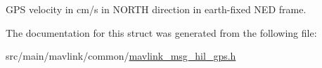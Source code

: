 G\+P\+S velocity in cm/s in N\+O\+R\+T\+H direction in earth-\/fixed N\+E\+D frame. 



The documentation for this struct was generated from the following file\+:\begin{DoxyCompactItemize}
\item 
src/main/mavlink/common/\hyperlink{mavlink__msg__hil__gps_8h}{mavlink\+\_\+msg\+\_\+hil\+\_\+gps.\+h}\end{DoxyCompactItemize}
